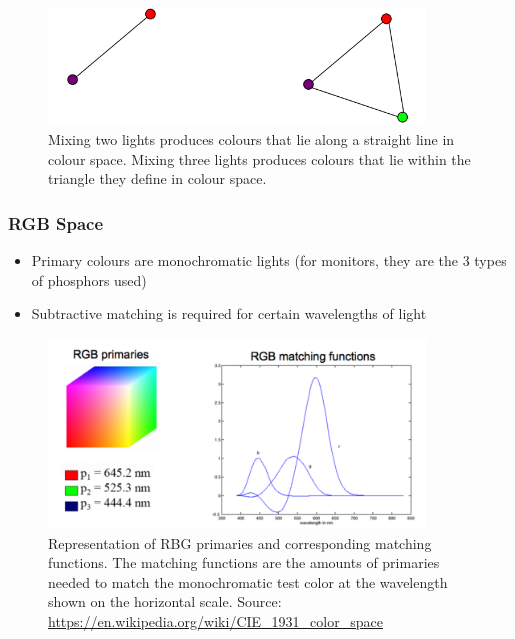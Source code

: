 \documentclass[letterpaper,12pt]{article}
\begin{document}
\begin{figure}[H]
 \centering
 \includegraphics[width=10cm]{images/colour.png}
 \caption{Mixing two lights produces colours that lie along a straight line in colour space. Mixing three lights produces colours that lie within the triangle they define in colour space.}
\end{figure}

\subsubsection{RGB Space}
\begin{itemize}
 \item Primary colours are monochromatic lights (for monitors, they are the 3 types of phosphors used)
 \item Subtractive matching is required for certain wavelengths of light
\end{itemize}

\begin{figure}[H]
 \centering
 \includegraphics[width=10cm]{images/rgb.png}
 \caption{Representation of RBG primaries and corresponding matching functions. The matching functions are the amounts of primaries needed to match the monochromatic test color at the wavelength shown on the horizontal scale. Source: \url{https://en.wikipedia.org/wiki/CIE_1931_color_space}}
\end{figure}
\end{document}

